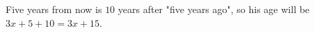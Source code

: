 Five years from now is $10$ years after "five years ago", so his age will be $3x+5+10=\boxed{3x+15}$.
